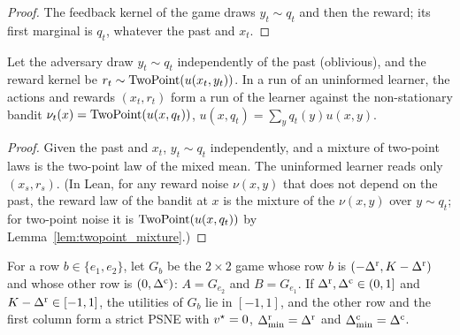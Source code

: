 \begin{proof}
  \leanok
  The feedback kernel of the game draws $y_t \sim q_t$ and then the reward; its first marginal is
  $q_t$, whatever the past and $x_t$.
\end{proof}

\begin{lemma}
  \label{lem:uninformed_oblivious}
  \leanok
  Let the adversary draw $y_t \sim q_t$ independently of the past (oblivious), and the reward kernel
  be $r_t \sim \mathrm{TwoPoint}(u(x_t, y_t))$. In a run of an uninformed learner, the actions and rewards
  $(x_t, r_t)$ form a run of the learner against the non-stationary bandit
  $\nu_t(x) = \mathrm{TwoPoint}(u(x, q_t))$, $u(x, q_t) = \sum_y q_t(y) u(x, y)$.
\end{lemma}

\begin{proof}
  \leanok
  Given the past and $x_t$, $y_t \sim q_t$ independently, and a mixture of two-point laws is the
  two-point law of the mixed mean. The uninformed learner reads only $(x_s, r_s)$. (In Lean, for any
  reward noise $\nu(x, y)$ that does not depend on the past, the reward law of the bandit at $x$ is
  the mixture of the $\nu(x, y)$ over $y \sim q_t$; for two-point noise it is
  $\mathrm{TwoPoint}(u(x, q_t))$ by Lemma~\ref{lem:twopoint_mixture}.)
\end{proof}

\begin{lemma}
  \label{lem:lb_games}
  \leanok
  For a row $b \in \{e_1, e_2\}$, let $G_b$ be the $2 \times 2$ game whose row $b$ is
  $(-\Delta^{\mathrm{r}}, K - \Delta^{\mathrm{r}})$ and whose other row is $(0, \Delta^{\mathrm{c}})$: $A = G_{e_2}$ and $B = G_{e_1}$. If
  $\Delta^{\mathrm{r}}, \Delta^{\mathrm{c}} \in (0, 1]$ and $K - \Delta^{\mathrm{r}} \in [-1, 1]$, the utilities of $G_b$ lie in $[-1, 1]$, and the
  other row and the first column form a strict PSNE with $v^\star = 0$, $\Delta^{\mathrm{r}}_{\min} = \Delta^{\mathrm{r}}$ and
  $\Delta^{\mathrm{c}}_{\min} = \Delta^{\mathrm{c}}$.
\end{lemma}

